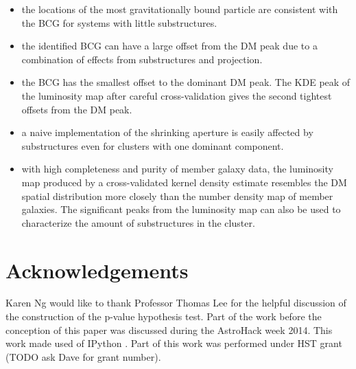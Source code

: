 \begin{itemize}
		\item the locations of the most gravitationally bound particle are consistent 
			with the BCG for systems with little substructures.  \\

		\item the identified BCG can have a large offset from the DM peak due to a
			combination of effects from substructures and projection. \\

		\item the BCG has the smallest offset to the dominant DM peak.  
			The KDE peak of the luminosity map after careful cross-validation 
			gives the second tightest offsets from the DM peak.  \\
		
		\item a naive implementation of the shrinking aperture is easily affected 
			by substructures even for clusters with one
			dominant component. \\  

		\item with high completeness and purity of member galaxy data, the
			luminosity map produced by a cross-validated kernel density estimate 
			resembles the DM spatial distribution more closely than 
			the number density map of member galaxies. The significant peaks from the 
			luminosity map can also be used to characterize the amount of substructures in
			the cluster.\\ 

	
\end{itemize}


\section{Acknowledgements}
Karen Ng would like to thank Professor Thomas Lee for the helpful discussion of 
the construction of the p-value hypothesis test. 
Part of the work before the conception of this paper was discussed during 
the AstroHack week 2014. This work made used of {\sc IPython}
\citep{Perez2007}.
Part of this work was performed under HST grant (TODO ask Dave for grant
number). 
% 
% 
% 
% 
% 
% 
% 

